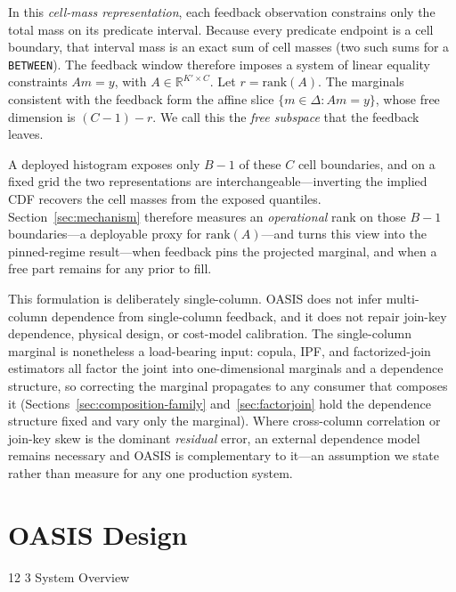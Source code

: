 \documentclass[preprint,12pt]{elsarticle}
\makeatletter
\renewcommand\subsection{\@startsection{subsection}{2}{\z@}%
           {12\p@ \@plus 6\p@ \@minus 3\p@}%
           {3\p@ \@plus 6\p@ \@minus 3\p@}%
           {\normalfont\normalsize\bfseries}}
\makeatother
\begin{document}
In this \emph{cell-mass representation}, each feedback observation constrains only the
total mass on its predicate interval. Because every predicate endpoint is a cell boundary,
that interval mass is an exact sum of cell masses (two such sums for a
\texttt{BETWEEN}). The feedback window therefore imposes a system of linear equality
constraints $A m = y$, with $A\in\mathbb{R}^{K'\times C}$. Let
$r=\mathrm{rank}(A)$. The marginals consistent with the feedback form the affine slice
$\{m\in\Delta : A m = y\}$, whose free dimension is $(C-1)-r$. We call this the
\emph{free subspace} that the feedback leaves.

A deployed histogram exposes only $B-1$ of these $C$ cell boundaries, and on a fixed grid
the two representations are interchangeable---inverting the implied CDF recovers the cell
masses from the exposed quantiles. Section~\ref{sec:mechanism} therefore measures an
\emph{operational} rank on those $B-1$ boundaries---a deployable proxy for
$\mathrm{rank}(A)$---and turns this view into the pinned-regime result---when feedback pins the
projected marginal, and when a free part remains for any prior to fill.

This formulation is deliberately single-column. OASIS does not infer multi-column
dependence from single-column feedback, and it does not repair join-key dependence,
physical design, or cost-model calibration. The single-column marginal is nonetheless a
load-bearing input: copula, IPF, and factorized-join estimators all factor the joint into
one-dimensional marginals and a dependence structure, so correcting the marginal propagates to
any consumer that composes it (Sections~\ref{sec:composition-family} and~\ref{sec:factorjoin}
hold the dependence structure fixed and vary only the marginal). Where cross-column correlation
or join-key skew is the dominant \emph{residual} error, an external dependence model remains
necessary and OASIS is complementary to it---an assumption we state rather than measure for any
one production system.

\section{OASIS Design}
\label{sec:design}

\subsection{System Overview}
\end{document}
